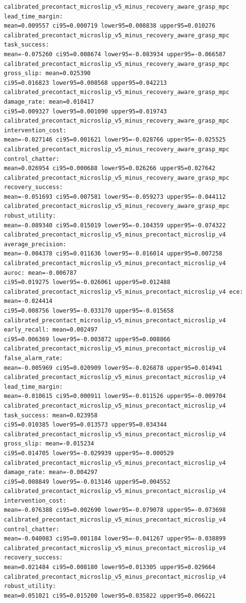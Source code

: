\documentclass{article}
\begin{document}
\begin{tiny}
\begin{verbatim}
calibrated_precontact_microslip_v5_minus_recovery_aware_grasp_mpc lead_time_margin:
mean=0.009557 ci95=0.000719 lower95=0.008838 upper95=0.010276
calibrated_precontact_microslip_v5_minus_recovery_aware_grasp_mpc task_success:
mean=-0.075260 ci95=0.008674 lower95=-0.083934 upper95=-0.066587
calibrated_precontact_microslip_v5_minus_recovery_aware_grasp_mpc gross_slip: mean=0.025390
ci95=0.016823 lower95=0.008568 upper95=0.042213
calibrated_precontact_microslip_v5_minus_recovery_aware_grasp_mpc damage_rate: mean=0.010417
ci95=0.009327 lower95=0.001090 upper95=0.019743
calibrated_precontact_microslip_v5_minus_recovery_aware_grasp_mpc intervention_cost:
mean=-0.027146 ci95=0.001621 lower95=-0.028766 upper95=-0.025525
calibrated_precontact_microslip_v5_minus_recovery_aware_grasp_mpc control_chatter:
mean=0.026954 ci95=0.000688 lower95=0.026266 upper95=0.027642
calibrated_precontact_microslip_v5_minus_recovery_aware_grasp_mpc recovery_success:
mean=-0.051693 ci95=0.007581 lower95=-0.059273 upper95=-0.044112
calibrated_precontact_microslip_v5_minus_recovery_aware_grasp_mpc robust_utility:
mean=-0.089340 ci95=0.015019 lower95=-0.104359 upper95=-0.074322
calibrated_precontact_microslip_v5_minus_precontact_microslip_v4 average_precision:
mean=-0.004378 ci95=0.011636 lower95=-0.016014 upper95=0.007258
calibrated_precontact_microslip_v5_minus_precontact_microslip_v4 auroc: mean=-0.006787
ci95=0.019275 lower95=-0.026061 upper95=0.012488
calibrated_precontact_microslip_v5_minus_precontact_microslip_v4 ece: mean=-0.024414
ci95=0.008756 lower95=-0.033170 upper95=-0.015658
calibrated_precontact_microslip_v5_minus_precontact_microslip_v4 early_recall: mean=0.002497
ci95=0.006369 lower95=-0.003872 upper95=0.008866
calibrated_precontact_microslip_v5_minus_precontact_microslip_v4 false_alarm_rate:
mean=-0.005969 ci95=0.020909 lower95=-0.026878 upper95=0.014941
calibrated_precontact_microslip_v5_minus_precontact_microslip_v4 lead_time_margin:
mean=-0.010615 ci95=0.000911 lower95=-0.011526 upper95=-0.009704
calibrated_precontact_microslip_v5_minus_precontact_microslip_v4 task_success: mean=0.023958
ci95=0.010385 lower95=0.013573 upper95=0.034344
calibrated_precontact_microslip_v5_minus_precontact_microslip_v4 gross_slip: mean=-0.015234
ci95=0.014705 lower95=-0.029939 upper95=-0.000529
calibrated_precontact_microslip_v5_minus_precontact_microslip_v4 damage_rate: mean=-0.004297
ci95=0.008849 lower95=-0.013146 upper95=0.004552
calibrated_precontact_microslip_v5_minus_precontact_microslip_v4 intervention_cost:
mean=-0.076388 ci95=0.002690 lower95=-0.079078 upper95=-0.073698
calibrated_precontact_microslip_v5_minus_precontact_microslip_v4 control_chatter:
mean=-0.040083 ci95=0.001184 lower95=-0.041267 upper95=-0.038899
calibrated_precontact_microslip_v5_minus_precontact_microslip_v4 recovery_success:
mean=0.021484 ci95=0.008180 lower95=0.013305 upper95=0.029664
calibrated_precontact_microslip_v5_minus_precontact_microslip_v4 robust_utility:
mean=0.051021 ci95=0.015200 lower95=0.035822 upper95=0.066221


\end{verbatim}
\end{tiny}
\end{document}
